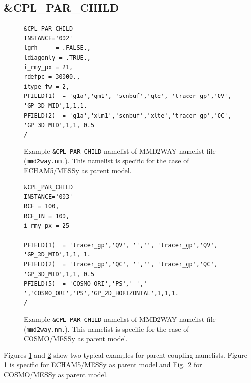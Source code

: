 \documentclass[11pt,twoside]{article}
\newcommand{\blockcode}{\ttfamily\color{OliveGreen}\par}
\begin{document}
\subsection{\protect\&CPL\_PAR\_CHILD \label{sec:cplparchild}}
\begin{figure}[h!]
\footnotesize
{\blockcode
\begin{verbatim} 
&CPL_PAR_CHILD
INSTANCE='002'
lgrh     = .FALSE.,
ldiagonly = .TRUE.,
i_rmy_px = 21,
rdefpc = 30000.,
itype_fw = 2,
PFIELD(1)  = 'g1a','qm1', 'scnbuf','qte', 'tracer_gp','QV', 'GP_3D_MID',1,1,1.
PFIELD(2)  = 'g1a','xlm1','scnbuf','xlte','tracer_gp','QC', 'GP_3D_MID',1,1, 0.5
/
\end{verbatim} 
}
\vspace*{-0.7cm}
\caption{Example {\tt \&CPL\_PAR\_CHILD}-namelist of MMD2WAY namelist file
({\tt mmd2way.nml}). This namelist is specific for the case of ECHAM5/MESSy as parent model.} 
\label{fig:nmlcplparchild1} 
\end{figure} 
\begin{figure}[h!]
\footnotesize
{\blockcode
\begin{verbatim} 
&CPL_PAR_CHILD
INSTANCE='003'
RCF = 100,
RCF_IN = 100,
i_rmy_px = 25

PFIELD(1)  = 'tracer_gp','QV', '','', 'tracer_gp','QV', 'GP_3D_MID',1,1, 1.
PFIELD(2)  = 'tracer_gp','QC', '','', 'tracer_gp','QC', 'GP_3D_MID',1,1, 0.5
PFIELD(5)  = 'COSMO_ORI','PS',' ',' ','COSMO_ORI','PS','GP_2D_HORIZONTAL',1,1,1.
/
\end{verbatim} 
}
\vspace*{-0.7cm}
\caption{Example {\tt \&CPL\_PAR\_CHILD}-namelist of MMD2WAY namelist file
({\tt mmd2way.nml}). This namelist is specific for the case of COSMO/MESSy as parent model.} 
\label{fig:nmlcplparchild2} 
\end{figure} 

Figures \ref{fig:nmlcplparchild1} and \ref{fig:nmlcplparchild2} show two
typical examples for parent coupling 
namelists. Figure \ref{fig:nmlcplparchild1} is specific for
ECHAM5/MESSy as parent model and Fig.\ \ref{fig:nmlcplparchild2} for
COSMO/MESSy as parent model. 
\end{document}
